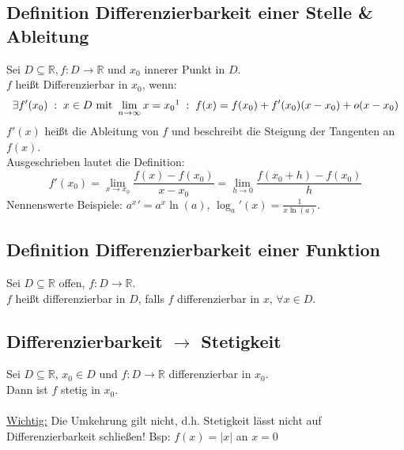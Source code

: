 \documentclass[halfparscip]{scrartcl}
\newcounter{subsection2}
\begin{document}
\subsection{Definition Differenzierbarkeit einer Stelle \& Ableitung}
Sei $D \subseteq \mathbb{R}, f: D \rightarrow \mathbb{R}$ und $x_0$ innerer Punkt in $D$.\\
$f$ heißt Differenzierbar in $x_0$, wenn:
\begin{equation*}
	\exists f'(x_0) \;:\; x \in D \text{ mit } \lim_{n \rightarrow \infty}x = x_0\footnotemark \;:\; f(x) = f(x_0) + f'(x_0)(x-x_0)+o(x-x_0)
\end{equation*}
$f'(x)$ heißt die Ableitung von $f$ und beschreibt die Steigung der Tangenten an $f(x)$.\\
Ausgeschrieben lautet die Definition:
\begin{equation*}
	f'(x_0) = \lim_{x\rightarrow x_0} \frac{f(x) - f(x_0)}{x - x_0} = \lim_{h\rightarrow 0} \frac{f(x_0 + h) - f(x_0)}{h}
\end{equation*}
Nennenswerte Beispiele: ${a^x}' = a^x \ln(a)$, $\log_a'(x) = \frac{1}{x \ln(a)}$.

\subsection{Definition Differenzierbarkeit einer Funktion}
Sei $D \subseteq \mathbb{R}$ offen, $f : D \rightarrow \mathbb{R}$.\\
$f$ heißt differenzierbar in $D$, falls $f$ differenzierbar in $x$, $\forall x \in D$.

\addtocounter{subsection}{2}
\subsection{Differenzierbarkeit $\rightarrow$ Stetigkeit}
Sei $D \subseteq \mathbb{R}$, $x_0 \in D$ und $f : D \rightarrow \mathbb{R}$ differenzierbar in $x_0$.\\
Dann ist $f$ stetig in $x_0$.\\\\
\underline{Wichtig:} Die Umkehrung gilt nicht, d.h. Stetigkeit lässt nicht auf Differenzierbarkeit schließen! Bsp: $f(x) = \vert x\vert$ an $x = 0$

\end{document}
